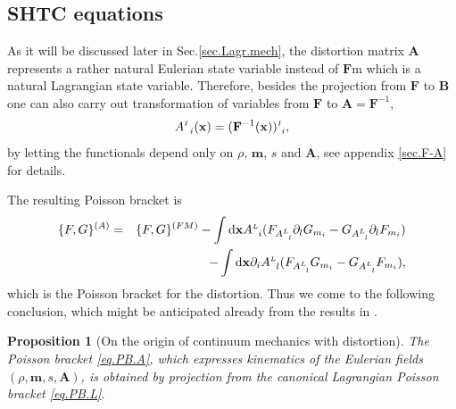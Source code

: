 \documentclass[
10pt, %
a4paper, %
oneside, %
headinclude,footinclude, %
BCOR5mm, %
]{scrartcl}
\newcommand{\xx}{\mathbf{x}}
\newcommand{\dx}{\mathrm{d}\xx}
\newcommand{\mm}{\mathbf{m}}
\newcommand{\FF}{\mathbf{F}}
\renewcommand{\AA}{\mathbf{A}}
\newcommand{\BB}{\mathbf{B}}
\newcommand{\IP}[1]{{\color{Red}IP:\ \ #1}}
\newcommand{\VK}[1]{{\color{Cyan}VK:\ \ #1}}
\newcommand{\sI}{{\mathsmaller I}}
\newcommand{\A}[2]{A^{\mathsmaller#1}_{\ \, #2}}
\newcommand{\Ffunc}{F}
\newcommand{\Gfunc}{G}
\newtheorem{prop}{Proposition}
\begin{document}
\subsection{SHTC equations}\label{sec.SHTC}

As it will be discussed later in Sec.\ref{sec.Lagr.mech}, the distortion matrix 
$ \AA $ represents a rather natural Eulerian state variable instead of $ \FF $m 
which is a natural Lagrangian state variable. Therefore, besides the projection 
from $\FF$ to $\BB$ one can also carry out transformation of variables from 
$\FF$ to $\AA = \FF^{-1}$,
\begin{equation}
	\A{I}{i}(\xx) = (\FF^{-1}(\xx))^\sI_{\ i},
\end{equation}
by letting the functionals depend only on $\rho$, $\mm$, $s$ and $\AA$, see 
appendix \ref{sec.F-A} for details. 

The resulting Poisson bracket is
\begin{eqnarray}\label{eq.PB.A}
	\{\Ffunc,\Gfunc\}^{(A)} &=& \{\Ffunc,\Gfunc\}^{(FM)} - \int\dx \A{L}{i} 
	(\Ffunc_{\A{L}{l}} \partial_l 
	\Gfunc_{m_i}-\Gfunc_{\A{L}{l} } \partial_l \Ffunc_{m_i})\nonumber\\
	&&-\int\dx \partial_i \A{L}{l} 
	(\Ffunc_{\A{L}{l}}\Gfunc_{m_i}-\Gfunc_{\A{L}{l}}\Ffunc_{m_i}),
\end{eqnarray}
which is the Poisson bracket for the distortion. Thus we come to the following conclusion, which might be anticipated already from the results in \cite{SHTC-GENERIC}.
\begin{prop}[On the origin of continuum mechanics with distortion]
The Poisson bracket \eqref{eq.PB.A}, which expresses kinematics of the Eulerian fields $(\rho,\mm,s,\AA)$, is obtained by projection from the canonical Lagrangian Poisson bracket \eqref{eq.PB.L}.
\end{prop}
\end{document}
